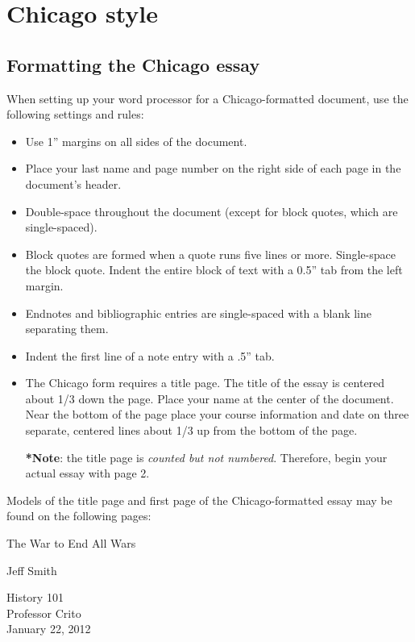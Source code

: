 

\chapter{Chicago style}

\section {Formatting the Chicago essay}

When setting up your word processor for a Chicago-formatted document, use the following settings and rules:

\begin{itemize}

\item Use 1'' margins on all sides of the document.
\item Place your last name and page number on the right side of each page in the document's header.
\item Double-space throughout the document (except for block quotes, which are single-spaced).
\item Block quotes are formed when a quote runs five lines or more. Single-space the block quote. Indent the entire block of text with a 0.5'' tab from the left margin.
\item Endnotes and bibliographic entries are single-spaced with a blank line separating them.
\item Indent the first line of a note entry with a .5'' tab.
\item The Chicago form requires a title page. The title of the essay is centered about 1/3 down the page. Place your name at the center of the document. Near the bottom of the page place your course information and date on three separate, centered lines about 1/3 up from the bottom of the page.

\textbf{*}\textbf{Note}: the title page is \emph{counted but not numbered}. Therefore, begin your actual essay with page 2.
\end{itemize}

Models of the title page and first page of the Chicago-formatted essay may be found on the following pages:

\newpage
\thispagestyle{empty}
\begin{Spacing}{2}
\vspace* {3cm}
\begin{center}The War to End All Wars\end{center}
\vspace {4cm}
\begin{center}Jeff Smith\end{center}
\vspace {7.2cm}
\begin{center}History 101\\
Professor Crito\\
January 22, 2012\end{center}
\end{Spacing}
\newpage

